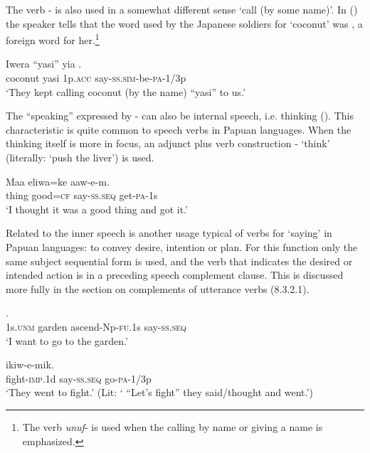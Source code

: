 The verb - is also used in a somewhat different sense `call (by some name)'. In () the speaker tells that the word used by the Japanese soldiers for `coconut' was , a foreign word for her.\footnote{The verb \textit{unuf}- is used when the calling by name or giving a name is emphasized.}

\ea%
\label{ex:x326}
\gll Iwera ``yasi'' yia . \\
coconut yasi 1p.\textsc{acc} say-\textsc{ss}.\textsc{sim}-be-\textsc{pa}-1/3p\\
\glt`They kept calling coconut (by the name) ``yasi'' to us.' 
\z

The ``speaking'' expressed by - can also be internal speech, i.e. thinking (). This characteristic is quite common to speech verbs in Papuan languages. When the thinking  itself is more in focus, an adjunct plus verb construction  - `think' (literally: `push the liver') is used.

\ea%
\label{ex:x327}
\gll Maa eliwa=ke  aaw-e-m. \\
thing good=\textsc{cf} say-\textsc{ss}.\textsc{seq} get-\textsc{pa}-1s \\
\glt`I thought it was a good thing and got it.'
\z

Related to the inner speech is another usage typical of verbs for `saying' in Papuan languages: to convey desire, intention or plan. For this function only the same subject sequential form\textit{}  is used, and the verb that indicates the desired or intended action is in a preceding speech complement clause. This is discussed more fully in the section on complements of utterance verbs (8.3.2.1). 

\ea%
\label{ex:x328}
 . \\
1s.\textsc{unm} garden ascend-Np-\textsc{fu}.1s say-\textsc{ss}.\textsc{seq} \\
\glt`I want to go to the garden.'
\z

\ea%
\label{ex:x329}
\gll [Irak-u]  ikiw-e-mik. \\
fight-\textsc{imp}.1d say-\textsc{ss}.\textsc{seq} go-\textsc{pa}-1/3p\\
\glt`They went to fight.' (Lit: ` ``Let's fight'' they said/thought and went.')
\z

